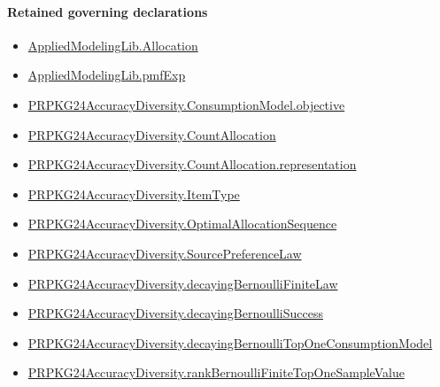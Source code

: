 \documentclass[10pt]{article}
\begin{document}
\paragraph{Retained governing declarations}
\begin{itemize}\raggedright
\item \hyperlink{governing-declaration-6972368b41f26c5a}{Applied\allowbreak{}Modeling\allowbreak{}Lib.\allowbreak{}Allocation}
\item \hyperlink{governing-declaration-8e4b4389a4f6454b}{Applied\allowbreak{}Modeling\allowbreak{}Lib.\allowbreak{}pmf\allowbreak{}Exp}
\item \hyperlink{governing-declaration-3ab045ef5e79a864}{PRPKG24\allowbreak{}Accuracy\allowbreak{}Diversity.\allowbreak{}Consumption\allowbreak{}Model.\allowbreak{}objective}
\item \hyperlink{governing-declaration-4fbd8fa467bd5d78}{PRPKG24\allowbreak{}Accuracy\allowbreak{}Diversity.\allowbreak{}Count\allowbreak{}Allocation}
\item \hyperlink{paper-prerequisite-29fb13a9ce74aef5}{PRPKG24\allowbreak{}Accuracy\allowbreak{}Diversity.\allowbreak{}Count\allowbreak{}Allocation.\allowbreak{}representation}
\item \hyperlink{governing-declaration-562ef32e180a12be}{PRPKG24\allowbreak{}Accuracy\allowbreak{}Diversity.\allowbreak{}Item\allowbreak{}Type}
\item \hyperlink{governing-declaration-98821e74d0c4230b}{PRPKG24\allowbreak{}Accuracy\allowbreak{}Diversity.\allowbreak{}Optimal\allowbreak{}Allocation\allowbreak{}Sequence}
\item \hyperlink{governing-declaration-e662f313179ba80f}{PRPKG24\allowbreak{}Accuracy\allowbreak{}Diversity.\allowbreak{}Source\allowbreak{}Preference\allowbreak{}Law}
\item \hyperlink{governing-declaration-103e1c9b673519e0}{PRPKG24\allowbreak{}Accuracy\allowbreak{}Diversity.\allowbreak{}decaying\allowbreak{}Bernoulli\allowbreak{}Finite\allowbreak{}Law}
\item \hyperlink{governing-declaration-ffcc682774320c24}{PRPKG24\allowbreak{}Accuracy\allowbreak{}Diversity.\allowbreak{}decaying\allowbreak{}Bernoulli\allowbreak{}Success}
\item \hyperlink{governing-declaration-5e42c599e5fbf6b4}{PRPKG24\allowbreak{}Accuracy\allowbreak{}Diversity.\allowbreak{}decaying\allowbreak{}Bernoulli\allowbreak{}Top\allowbreak{}One\allowbreak{}Consumption\allowbreak{}Model}
\item \hyperlink{governing-declaration-1c836904ae5b934e}{PRPKG24\allowbreak{}Accuracy\allowbreak{}Diversity.\allowbreak{}rank\allowbreak{}Bernoulli\allowbreak{}Finite\allowbreak{}Top\allowbreak{}One\allowbreak{}Sample\allowbreak{}Value}
\end{itemize}
\end{document}
